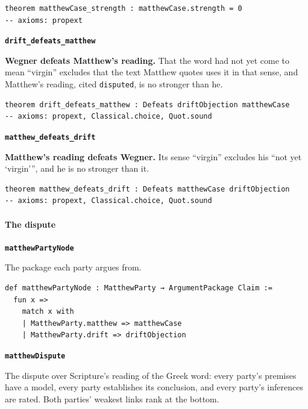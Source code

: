 \documentclass[11pt]{article}
\begin{document}
{\small\begin{verbatim}
theorem matthewCase_strength : matthewCase.strength = 0
-- axioms: propext
\end{verbatim}}
\par\medskip\noindent\textbf{\texttt{drift\_\allowbreak{}defeats\_\allowbreak{}matthew}}\par\nobreak\noindent
\textbf{Wegner defeats Matthew’s reading.} That the word had not yet come to mean “virgin” excludes that the text Matthew quotes uses it in that sense, and Matthew’s reading, cited \texttt{disputed}, is no stronger than he.

{\small\begin{verbatim}
theorem drift_defeats_matthew : Defeats driftObjection matthewCase
-- axioms: propext, Classical.choice, Quot.sound
\end{verbatim}}
\par\medskip\noindent\textbf{\texttt{matthew\_\allowbreak{}defeats\_\allowbreak{}drift}}\par\nobreak\noindent
\textbf{Matthew’s reading defeats Wegner.} Its sense “virgin” excludes his “not yet ‘virgin’”, and he is no stronger than it.

{\small\begin{verbatim}
theorem matthew_defeats_drift : Defeats matthewCase driftObjection
-- axioms: propext, Classical.choice, Quot.sound
\end{verbatim}}
\paragraph*{The dispute}
\leavevmode\par\nobreak
\par\medskip\noindent\textbf{\texttt{matthew\allowbreak{}Party\allowbreak{}Node}}\par\nobreak\noindent
The package each party argues from.

{\small\begin{verbatim}
def matthewPartyNode : MatthewParty → ArgumentPackage Claim :=
  fun x =>
    match x with
    | MatthewParty.matthew => matthewCase
    | MatthewParty.drift => driftObjection
\end{verbatim}}
\par\medskip\noindent\textbf{\texttt{matthew\allowbreak{}Dispute}}\par\nobreak\noindent
The dispute over Scripture’s reading of the Greek word: every party’s premises have a model, every party establishes its conclusion, and every party’s inferences are rated. Both parties’ weakest links rank at the bottom.
\end{document}
